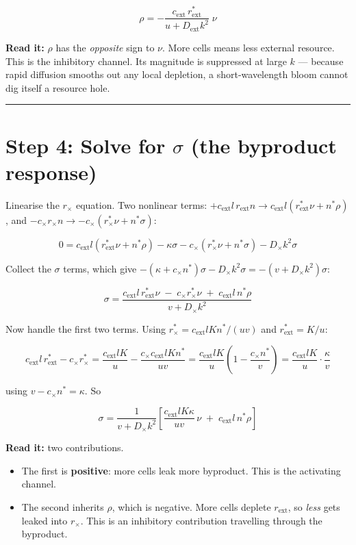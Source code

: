 \documentclass[11pt]{article}
\begin{document}
\[
\boxed{\;\rho = -\frac{c_{\text{ext}}\, r_{\text{ext}}^*}{u + D_{\text{ext}}k^2}\;\nu\;}
\]

\textbf{Read it:} $\rho$ has the \emph{opposite} sign to $\nu$. More cells means less external resource. This is the inhibitory channel. Its magnitude is suppressed at large $k$ --- because rapid diffusion smooths out any local depletion, a short-wavelength bloom cannot dig itself a resource hole.

\bigskip\hrule\bigskip

\section*{Step 4: Solve for $\sigma$ (the byproduct response)}

Linearise the $r_\times$ equation. Two nonlinear terms: $+c_{\text{ext}}l\, r_{\text{ext}}n \to c_{\text{ext}}l(r_{\text{ext}}^*\nu + n^*\rho)$, and $-c_\times r_\times n \to -c_\times(r_\times^*\nu + n^*\sigma)$:

\[
0 = c_{\text{ext}}l\left(r_{\text{ext}}^*\nu + n^*\rho\right) - \kappa\sigma - c_\times\left(r_\times^*\nu + n^*\sigma\right) - D_\times k^2 \sigma
\]

Collect the $\sigma$ terms, which give $-(\kappa + c_\times n^*)\sigma - D_\times k^2\sigma = -(v + D_\times k^2)\sigma$:

\[
\sigma = \frac{c_{\text{ext}}l\, r_{\text{ext}}^*\nu \;-\; c_\times r_\times^* \nu \;+\; c_{\text{ext}}l\, n^*\rho}{v + D_\times k^2}
\]

Now handle the first two terms. Using $r_\times^* = c_{\text{ext}}lKn^*/(uv)$ and $r_{\text{ext}}^*=K/u$:

\[
c_{\text{ext}}l\,r_{\text{ext}}^* - c_\times r_\times^* = \frac{c_{\text{ext}}lK}{u} - \frac{c_\times c_{\text{ext}}lKn^*}{uv} = \frac{c_{\text{ext}}lK}{u}\left(1 - \frac{c_\times n^*}{v}\right) = \frac{c_{\text{ext}}lK}{u}\cdot\frac{\kappa}{v}
\]

using $v - c_\times n^* = \kappa$. So

\[
\boxed{\;\sigma = \frac{1}{v+D_\times k^2}\left[\frac{c_{\text{ext}}lK\kappa}{uv}\,\nu \;+\; c_{\text{ext}}l\,n^*\rho\right]\;}
\]

\textbf{Read it:} two contributions.
\begin{itemize}
  \item The first is \textbf{positive}: more cells leak more byproduct. This is the activating channel.
  \item The second inherits $\rho$, which is negative. More cells deplete $r_{\text{ext}}$, so \emph{less} gets leaked into $r_\times$. This is an inhibitory contribution travelling through the byproduct.
\end{itemize}
\end{document}
